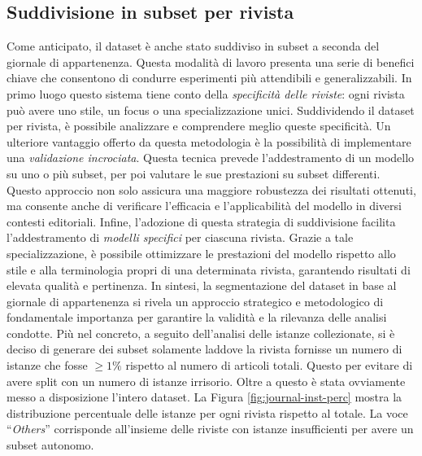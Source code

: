 \documentclass[12pt,a4paper,twoside,openright]{book}
\begin{document}
\subsection{Suddivisione in subset per rivista}
Come anticipato, il dataset è anche stato suddiviso in subset a seconda del giornale di appartenenza. Questa modalità di lavoro presenta una serie di benefici chiave che consentono di condurre esperimenti più attendibili e generalizzabili. 
In primo luogo questo sistema tiene conto della \emph{specificità delle riviste}: ogni rivista può avere uno stile, un focus o una specializzazione unici. Suddividendo il dataset per rivista, è possibile analizzare e comprendere meglio queste specificità. Un ulteriore vantaggio offerto da questa metodologia è la possibilità di implementare una \emph{validazione incrociata}. Questa tecnica prevede l'addestramento di un modello su uno o più subset, per poi valutare le sue prestazioni su subset differenti. Questo approccio non solo assicura una maggiore robustezza dei risultati ottenuti, ma consente anche di verificare l'efficacia e l'applicabilità del modello in diversi contesti editoriali.
Infine, l'adozione di questa strategia di suddivisione facilita l'addestramento di \emph{modelli specifici} per ciascuna rivista. Grazie a tale specializzazione, è possibile ottimizzare le prestazioni del modello rispetto allo stile e alla terminologia propri di una determinata rivista, garantendo risultati di elevata qualità e pertinenza.
In sintesi, la segmentazione del dataset in base al giornale di appartenenza si rivela un approccio strategico e metodologico di fondamentale importanza per garantire la validità e la rilevanza delle analisi condotte.
Più nel concreto, a seguito dell'analisi delle istanze collezionate, si è deciso di generare dei subset solamente laddove la rivista fornisse un numero di istanze che fosse $\geq 1\%$ rispetto al numero di articoli totali. Questo per evitare di avere split con un numero di istanze irrisorio. Oltre a questo è stata ovviamente messo a disposizione l'intero dataset. 
La Figura \ref{fig:journal-inst-perc} mostra la distribuzione percentuale delle istanze per ogni rivista rispetto al totale. La voce ``\emph{Others}'' corrisponde all'insieme delle riviste con istanze insufficienti per avere un subset autonomo.
\end{document}
